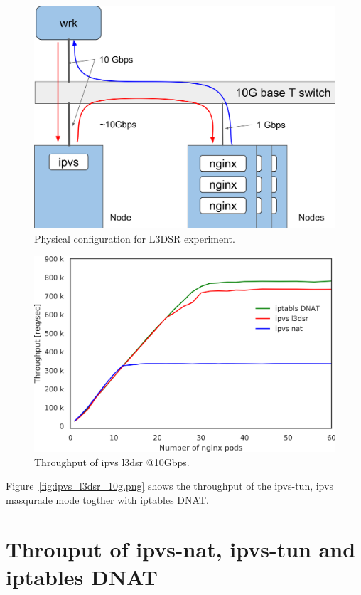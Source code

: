 \begin{figure}[h]
  \centering
  \includegraphics[width=0.8\columnwidth]{Figs/bench_10g_l3dsr}
  \caption{Physical configuration for L3DSR experiment.}
  \label{fig:bench_10g_l3dsr}
\end{figure}


\begin{figure}[h]
  \centering
  \includegraphics[width=0.8\columnwidth]{Figs/ipvs_l3dsr_10g}
  \caption{Throughput of ipvs l3dsr @10Gbps.}
  \label{fig:ipvs_l3dsr_10g}
\end{figure}

Figure~\ref{fig:ipvs_l3dsr_10g.png} shows the throughput of the ipvs-tun, ipvs masqurade mode togther with iptables DNAT.

\FloatBarrier
\section{Throuput of ipvs-nat, ipvs-tun and iptables DNAT}

